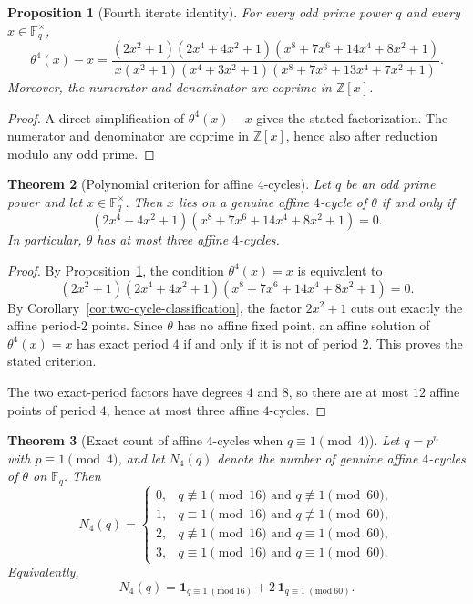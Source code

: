 \documentclass[11pt]{article}
\newtheorem{theorem}{Theorem}
\newtheorem{proposition}[theorem]{Proposition}
\newcommand{\F}{\mathbb{F}}
\begin{document}
\begin{proposition}[Fourth iterate identity]
\label{prop:fourth-iterate}
For every odd prime power $q$ and every $x\in\F_q^\times$,
\[
\theta^4(x)-x
=
\frac{(2x^2+1)(2x^4+4x^2+1)(x^8+7x^6+14x^4+8x^2+1)}
{x(x^2+1)(x^4+3x^2+1)(x^8+7x^6+13x^4+7x^2+1)}.
\]
Moreover, the numerator and denominator are coprime in $\mathbb{Z}[x]$.
\end{proposition}

\begin{proof}
A direct simplification of $\theta^4(x)-x$ gives the stated factorization.
The numerator and denominator are coprime in $\mathbb{Z}[x]$, hence also after reduction modulo any odd prime.
\end{proof}

\begin{theorem}[Polynomial criterion for affine $4$-cycles]
\label{thm:four-cycle-poly}
Let $q$ be an odd prime power and let $x\in\F_q^\times$.
Then $x$ lies on a genuine affine $4$-cycle of $\theta$ if and only if
\[
(2x^4+4x^2+1)(x^8+7x^6+14x^4+8x^2+1)=0.
\]
In particular, $\theta$ has at most three affine $4$-cycles.
\end{theorem}

\begin{proof}
By Proposition~\ref{prop:fourth-iterate}, the condition $\theta^4(x)=x$ is equivalent to
\[
(2x^2+1)(2x^4+4x^2+1)(x^8+7x^6+14x^4+8x^2+1)=0.
\]
By Corollary~\ref{cor:two-cycle-classification}, the factor $2x^2+1$ cuts out exactly the affine period-$2$ points.
Since $\theta$ has no affine fixed point, an affine solution of $\theta^4(x)=x$ has exact period $4$ if and only if it is not of period $2$.
This proves the stated criterion.

The two exact-period factors have degrees $4$ and $8$, so there are at most $12$ affine points of period $4$, hence at most three affine $4$-cycles.
\end{proof}

\begin{theorem}[Exact count of affine $4$-cycles when $q\equiv 1\pmod4$]
\label{thm:four-cycle-existence}
Let $q=p^n$ with $p\equiv 1\pmod4$, and let $N_4(q)$ denote the number of genuine affine $4$-cycles of $\theta$ on $\F_q$.
Then
\[
N_4(q)=
\begin{cases}
0,& q\not\equiv 1\pmod{16}\text{ and }q\not\equiv 1\pmod{60},\\
1,& q\equiv 1\pmod{16}\text{ and }q\not\equiv 1\pmod{60},\\
2,& q\not\equiv 1\pmod{16}\text{ and }q\equiv 1\pmod{60},\\
3,& q\equiv 1\pmod{16}\text{ and }q\equiv 1\pmod{60}.
\end{cases}
\]
Equivalently,
\[
N_4(q)=\mathbf{1}_{q\equiv 1\ (\mathrm{mod}\ 16)}+2\,\mathbf{1}_{q\equiv 1\ (\mathrm{mod}\ 60)}.
\]
\end{theorem}
\end{document}
